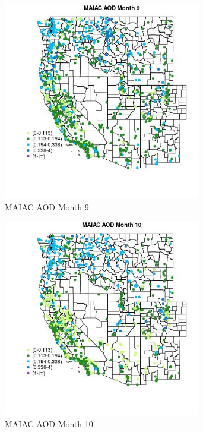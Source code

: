 \begin{figure} 
\centering  
\includegraphics[width=0.77\textwidth]{Code_Outputs/Report_ML_input_PM25_Step4_part_f_de_duplicated_aves_prioritize_24hr_obswNAs_MapObsMo9MAIAC_AOD.jpg} 
\caption{\label{fig:Report_ML_input_PM25_Step4_part_f_de_duplicated_aves_prioritize_24hr_obswNAsMapObsMo9MAIAC_AOD}MAIAC AOD Month 9} 
\end{figure} 
 

\begin{figure} 
\centering  
\includegraphics[width=0.77\textwidth]{Code_Outputs/Report_ML_input_PM25_Step4_part_f_de_duplicated_aves_prioritize_24hr_obswNAs_MapObsMo10MAIAC_AOD.jpg} 
\caption{\label{fig:Report_ML_input_PM25_Step4_part_f_de_duplicated_aves_prioritize_24hr_obswNAsMapObsMo10MAIAC_AOD}MAIAC AOD Month 10} 
\end{figure} 
 

